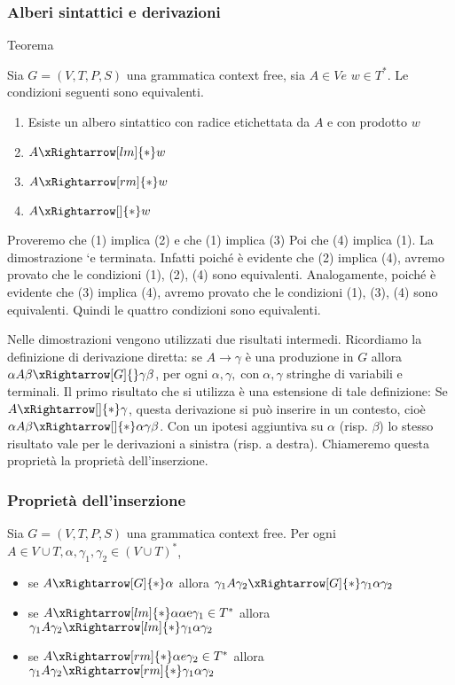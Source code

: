 \subsubsection{Alberi sintattici e derivazioni}

Teorema

Sia $G=(V, T, P, S)$ una grammatica context free, sia $A \in V e$ $w \in T^{*}$. Le condizioni seguenti sono equivalenti.
\begin{enumerate}
    \item Esiste un albero sintattico con radice etichettata da $A$ e con prodotto $w$
    \item $A \xRightarrow[lm]{*} w$
    \item $A \xRightarrow[rm]{*} w$
    \item $A \xRightarrow[]{*} w$
\end{enumerate}

Proveremo che (1) implica (2)
e che (1) implica (3)
Poi che (4) implica (1).
La dimostrazione `e terminata. Infatti poiché è evidente che (2) implica (4), avremo provato che le condizioni (1), (2), (4) sono equivalenti.
Analogamente, poiché è evidente che (3) implica (4), avremo provato che le condizioni (1), (3), (4) sono equivalenti.
Quindi le quattro condizioni sono equivalenti.

Nelle dimostrazioni vengono utilizzati due risultati intermedi.
Ricordiamo la definizione di derivazione diretta: se $A \rightarrow \gamma$ è una produzione in $G$ allora $\alpha A \beta \xRightarrow[G]{} \gamma \beta$, per ogni $\alpha, \gamma, \operatorname{con} \alpha, \gamma$ stringhe di variabili e terminali.
Il primo risultato che si utilizza è una estensione di tale definizione: Se $A \xRightarrow[]{*} \gamma$, questa derivazione si può inserire in un contesto, cioè $\alpha A \beta \xRightarrow[]{*} \alpha \gamma \beta$. Con un ipotesi aggiuntiva su $\alpha$ (risp. $\beta$) lo stesso risultato vale per le derivazioni a sinistra (risp. a destra).
Chiameremo questa proprietà la proprietà dell'inserzione.

\subsubsection{Proprietà dell'inserzione}

Sia $G=(V, T, P, S)$ una grammatica context free. Per ogni $A \in V \cup T, \alpha, \gamma_{1}, \gamma_{2} \in(V \cup T)^{*}$,
\begin{itemize}
    \item se $A \xRightarrow[G]{*} \alpha$ allora $\gamma_{1} A \gamma_{2} \xRightarrow[G]{*} \gamma_{1} \alpha \gamma_{2}$
    \item se $A \xRightarrow[lm]{*} \alpha \alpha \mathrm{e} \gamma_{1} \in T^{*}$ allora $\gamma_{1} A \gamma_{2} \xRightarrow[lm]{*} \gamma_{1} \alpha \gamma_{2}$
    \item se $A \xRightarrow[rm]{*} \alpha e \gamma_{2} \in T^{*}$ allora $\gamma_{1} A \gamma_{2} \xRightarrow[rm]{*} \gamma_{1} \alpha \gamma_{2}$
\end{itemize}

